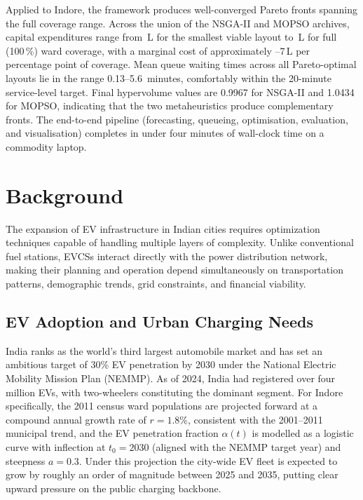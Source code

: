 Applied to Indore, the framework produces well-converged Pareto
fronts spanning the full coverage range. Across the union of the
NSGA-II and MOPSO archives, capital expenditures range from
\,L for the smallest viable layout to \,L for full
(100\,\%) ward coverage, with a marginal cost of approximately
--7\,L per percentage point of coverage. Mean queue waiting
times across all Pareto-optimal layouts lie in the range
0.13--5.6~minutes, comfortably within the 20-minute service-level
target. Final hypervolume values are 0.9967 for NSGA-II and 1.0434
for MOPSO, indicating that the two metaheuristics produce
complementary fronts. The end-to-end pipeline (forecasting,
queueing, optimisation, evaluation, and visualisation) completes in
under four minutes of wall-clock time on a commodity laptop.

\section{Background}
\label{sec:intro_background}

The expansion of EV infrastructure in Indian cities requires optimization
techniques capable of handling multiple layers of complexity. Unlike
conventional fuel stations, EVCSs interact directly with the power
distribution network, making their planning and operation depend
simultaneously on transportation patterns, demographic trends, grid
constraints, and financial viability.

\subsection{EV Adoption and Urban Charging Needs}

India ranks as the world's third largest automobile market and has
set an ambitious target of 30\% EV penetration by 2030 under the
National Electric Mobility Mission Plan (NEMMP). As of 2024, India
had registered over four million EVs, with two-wheelers
constituting the dominant segment. For Indore specifically, the
2011 census ward populations are projected forward at a compound
annual growth rate of $r = 1.8\%$, consistent with the 2001--2011
municipal trend, and the EV penetration fraction $\alpha(t)$ is
modelled as a logistic curve with inflection at $t_0 = 2030$
(aligned with the NEMMP target year) and steepness $a = 0.3$.
Under this projection the city-wide EV fleet is expected to grow by
roughly an order of magnitude between 2025 and 2035, putting clear
upward pressure on the public charging backbone.

